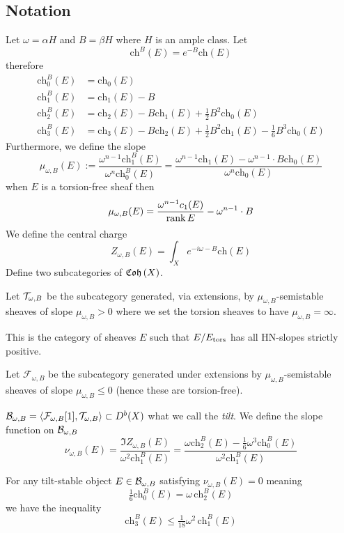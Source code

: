 \documentclass[12pt]{article}
\renewcommand{\ch}{\mathrm{ch}}
\renewcommand{\F}{\mathcal{F}}
\begin{document}
\subsection{Notation}

Let $\omega = \alpha H$ and $B = \beta H$ where $H$ is an ample class. Let 
\[ \ch^B(E) = e^{-B} \ch(E) \]
therefore
\begin{align*}
\ch_0^B(E) &= \ch_0(E)
\\
\ch_1^B(E) &= \ch_1(E) - B
\\
\ch_2^B(E) &= \ch_2(E) - B \ch_1(E) + \tfrac{1}{2} B^2 \ch_0(E)
\\
\ch_3^B(E) &= \ch_3(E) - B \ch_2(E) + \tfrac{1}{2} B^2 \ch_1(E) - \tfrac{1}{6} B^3 \ch_0(E)
\end{align*}
Furthermore, we define the slope 
\[ \mu_{\omega, B}(E) := \frac{\omega^{n-1} \ch_1^B(E)}{\omega^n \ch_0^B(E)} = \frac{\omega^{n-1} \ch_1(E) - \omega^{n-1} \cdot B \ch_0(E)}{\omega^n \ch_0(E)} \]
when $E$ is a torsion-free sheaf then 
\[ \mu_{\omega, B}(E) = \frac{\omega^{n-1}c_1(E)}{\operatorname{\mathrm{rank}}{E}} - \omega^{n-1} \cdot B \]
We define the central charge
\[ Z_{\omega,B}(E) = \int_X e^{-i\omega - B} \ch(E) \]
Define two subcategories of $\mathfrak{Coh}\left(X\right)$. 

\begin{defn}
Let $\mathcal{T}_{\omega,B}$ be the subcategory generated, via extensions, by $\mu_{\omega, B}$-semistable sheaves of slope $\mu_{\omega, B} > 0$ where we set the torsion sheaves to have $\mu_{\omega,B} = \infty$. 
\end{defn} 

This is the category of sheaves $E$ such that $E / E_{\mathrm{tors}}$ has all HN-slopes strictly positive. 

\begin{defn}
Let $\F_{\omega, B}$ be the subcategory generated under extensions by $\mu_{\omega,B}$-semistable sheaves of slope $\mu_{\omega,B} \le 0$ (hence these are torsion-free).
\end{defn}

\begin{defn}
$\cB_{\omega,B} = \left< \F_{\omega,B}[1], \T_{\omega,B} \right> \subset D^b(X)$ what we call the \textit{tilt}. We define the slope function on $\mathcal{B}_{\omega,B}$
\[ \nu_{\omega,B}(E) = \frac{\Im{Z_{\omega,B}(E)}}{\omega^2 \ch_1^B(E)} = \frac{\omega \ch_2^B(E) - \tfrac{1}{6} \omega^3 \ch_0^B(E)}{\omega^2 \ch_1^B(E)} \]
\end{defn}

\begin{conj}
For any tilt-stable object $E \in \mathcal{B}_{\omega,B}$ satisfying $\nu_{\omega,B}(E) = 0$ meaning
\[ \tfrac{1}{6} \ch_0^B(E) = \omega \, \ch_2^B(E) \]
we have the inequality
\[ \ch_3^B(E) \le \tfrac{1}{18} \omega^2 \, \ch_1^B(E) \]
\end{conj}
\end{document}
